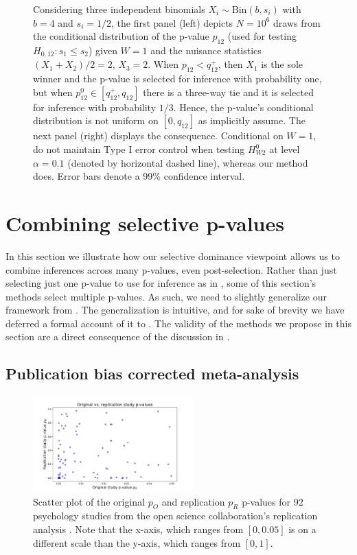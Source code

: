 \documentclass{article}
\begin{document}
\begin{figure}[]
    \caption{Considering three independent binomials $X_i \sim \text{Bin}(b, s_i)$ with $b=4$ and $s_i = 1/2$, the first panel (left) depicts $N=10^6$ draws from the conditional distribution of the p-value $p_{12}$ (used for testing $H_{0, 12}: s_1 \leq s_2$) given $W = 1$ and the nuisance statistics $(X_1 + X_2)/2 = 2$, $X_3=2$. When $p_{12}  < q^+_{12}$, then $X_1$ is the sole winner and the p-value is selected for inference with probability one, but when $p_{12}^0 \in [q^+_{12}, q_{12}]$ there is a three-way tie and it is selected for inference with probability $1/3$. Hence, the p-value's conditional distribution is not uniform on $[0, q_{12}]$ as \cite{Hung2019} implicitly assume. The next panel (right) displays the consequence. Conditional on $W=1$, \cite{Hung2019} do not maintain Type I error control when testing $H^{0}_{W2}$ at level $\alpha=0.1$ (denoted by horizontal dashed line), whereas our method does. Error bars denote a 99\% confidence interval.}
    \label{fig:error_control}
\end{figure}

\section{Combining selective p-values}
\label{sec:multiple}

In this section we illustrate how our selective dominance viewpoint allows us to combine inferences across many p-values, even post-selection. Rather than just selecting just one p-value to use for inference as in , some of this section's methods select multiple p-values. As such, we need to slightly generalize our framework from . The generalization is intuitive, and for sake of brevity we have deferred a formal account of it to . The validity of the methods we propose in this section are a direct consequence of the discussion in  . 

\subsection{Publication bias corrected meta-analysis}

\begin{figure}
    \centering
    \includegraphics[width=0.55\textwidth]{replication.pdf} %
    \caption{Scatter plot of the original $p_O$ and replication $p_R$ p-values for 92 psychology studies from the open science collaboration's replication analysis \cite{OSF}. Note that the x-axis, which ranges from $[0, 0.05]$ is on a different scale than the y-axis, which ranges from $[0, 1]$. }
    \label{fig:replication}
\end{figure}
\end{document}
